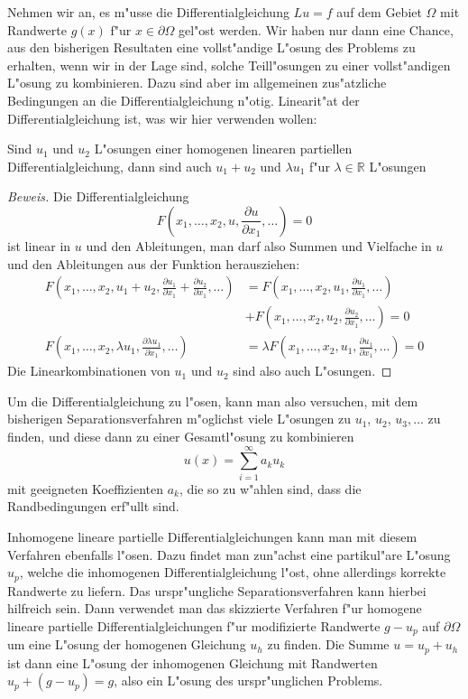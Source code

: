 Nehmen wir an, es m"usse die Differentialgleichung $Lu=f$ auf dem
Gebiet $\Omega$ mit Randwerte $g(x)$ f"ur $x\in\partial \Omega$
gel"ost werden.
Wir haben nur dann eine Chance, aus den bisherigen Resultaten eine 
vollst"andige L"osung des Problems zu erhalten, wenn wir in der
Lage sind, solche Teill"osungen zu einer vollst"andigen L"osung
zu kombinieren. Dazu sind aber im allgemeinen zus"atzliche
Bedingungen an die Differentialgleichung n"otig. Linearit"at der
Differentialgleichung ist, was wir hier verwenden wollen:

\begin{satz}Sind $u_1$ und $u_2$ L"osungen einer homogenen linearen partiellen
Differentialgleichung, dann sind auch $u_1+u_2$ und $\lambda u_1$ f"ur
$\lambda\in\mathbb R$ L"osungen
\end{satz}

\begin{proof}[Beweis]
Die Differentialgleichung
\[
F(x_1,\dots,x_2,u,\frac{\partial u}{\partial x_1},\dots)=0
\]
ist linear in $u$ und den Ableitungen, man darf also Summen und Vielfache
in $u$ und den Ableitungen aus der Funktion herausziehen:
\begin{align*}
F(x_1,\dots,x_2,u_1+u_2,\frac{\partial u_1}{\partial x_1}+\frac{\partial u_2}{\partial x_1},\dots)
&=
F(x_1,\dots,x_2,u_1,\frac{\partial u_1}{\partial x_1},\dots)
\\
&+
F(x_1,\dots,x_2,u_2,\frac{\partial u_2}{\partial x_1},\dots)=0
\\
F(x_1,\dots,x_2,\lambda u_1,\frac{\partial \lambda u_1}{\partial x_1},\dots)
&=
\lambda
F(x_1,\dots,x_2,u_1,\frac{\partial u_1}{\partial x_1},\dots)
=0
\end{align*}
Die Linearkombinationen von $u_1$ und $u_2$ sind also auch L"osungen.
\end{proof}

Um die Differentialgleichung zu l"osen, kann man also versuchen, mit
dem bisherigen Separationsverfahren m"oglichst viele L"osungen zu
$u_1$, $u_2$, $u_3,\dots$ zu finden, und diese dann zu einer Gesamtl"osung
zu kombinieren
\[
u(x)=\sum_{i=1}^\infty a_ku_k
\]
mit geeigneten Koeffizienten $a_k$, die so zu w"ahlen sind, dass die
Randbedingungen erf"ullt sind.

Inhomogene lineare partielle Differentialgleichungen kann man mit diesem
Verfahren ebenfalls l"osen. Dazu findet man zun"achst eine partikul"are
L"osung $u_p$, welche die inhomogenen Differentialgleichung l"ost, ohne
allerdings korrekte Randwerte zu liefern.
Das urspr"ungliche Separationsverfahren kann hierbei hilfreich sein.
Dann verwendet man das skizzierte Verfahren f"ur homogene lineare
partielle Differentialgleichungen f"ur modifizierte Randwerte $g-u_p$ auf
$\partial\Omega$ um eine L"osung der homogenen Gleichung $u_h$ zu finden.
Die Summe $u=u_p+u_h$ ist dann eine L"osung der inhomogenen Gleichung
mit Randwerten $u_p + (g-u_p)=g$, also ein L"osung des urspr"unglichen
Problems.

